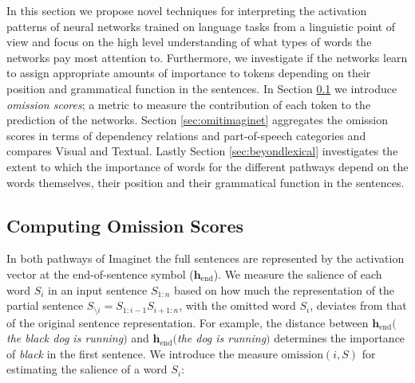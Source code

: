  
In this section we propose novel techniques for interpreting the
activation patterns of neural networks trained on language tasks
from a linguistic point of view and focus
on the high level understanding of what types of words the networks
pay most attention to. Furthermore, we investigate if the networks
learn to assign appropriate amounts of importance to tokens depending
on their position and grammatical function in the sentences.\label{edit:whyposdep}
In Section \ref{sec:computeomission} we introduce \emph{omission scores};
a metric to measure the contribution of each token to the prediction of the networks.
Section \ref{sec:omitimaginet} aggregates the omission scores in terms
of dependency relations and part-of-speech categories and compares {\sc Visual}
and {\sc Textual}. Lastly Section \ref{sec:beyondlexical} investigates the extent to which
the importance of words for the different pathways depend on the words themselves,
their position and their grammatical function in the sentences.

\subsection{Computing Omission Scores}
\label{sec:computeomission}

In both pathways of {\sc Imaginet} the full sentences are represented by the
activation vector at the end-of-sentence symbol
($\mathbf{h}_\text{end}$). We measure the salience of each word $S_i$
in an input sentence $S_{1:n}$ based on how much the representation of the
partial sentence $S_{\setminus i} = S_{1:i-1}S_{i+1:n}$, with
the omitted word $S_i$, deviates from that of the original sentence
representation. For example, the distance
between $\mathbf{h}_\text{end}(${\it the black dog is running}$)$
and $\mathbf{h}_\text{end}(${\it the dog is running}$)$ determines
the importance of {\it black} in the first sentence. We introduce the
measure $\mathrm{omission}(i,S)$ for estimating the salience of a word $S_i$:

